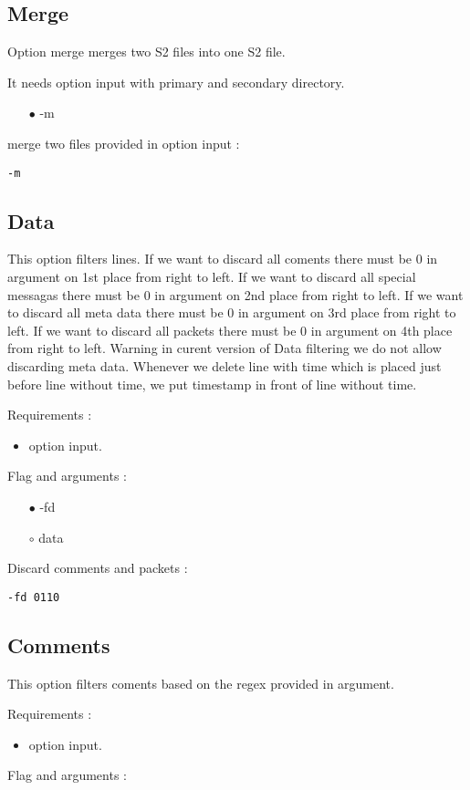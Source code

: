 \documentclass[english]{article}
\begin{document}
\subsection{Merge}
Option merge merges two S2 files into one S2 file. 

It needs option input with primary and secondary directory.
\begin{itemize}
 \item[$\bullet$] -m
 \end{itemize}
merge two files provided in option input : \begin{lstlisting} 
-m
\end{lstlisting}


\subsection{Data}
This option filters lines. If we want to discard all coments there must be 0 in argument on 1st place from right to left. If we want to discard all special messagas there must be 0 in argument on 2nd place from right to left. If we want to discard all meta data there must be 0 in argument on 3rd place from right to left. If we want to discard all packets there must be 0 in argument on 4th place from right to left. Warning in curent version of Data filtering we do not allow discarding meta data. Whenever we delete line with time which is placed just before line without time, we put timestamp in front of line without time.

\noindent Requirements : 
\begin{itemize}
\item option input. 
\end{itemize}
Flag and arguments :
\begin{itemize}
\item[$\bullet$] -fd
\item[$\circ$] data
\end{itemize}
Discard comments and packets : 
\begin{lstlisting} 
-fd 0110
\end{lstlisting}


\subsection{Comments}
This option filters coments based on the regex provided in argument.

\noindent Requirements : 
\begin{itemize}
\item option input. 
\end{itemize}
Flag and arguments : 
\end{document}
